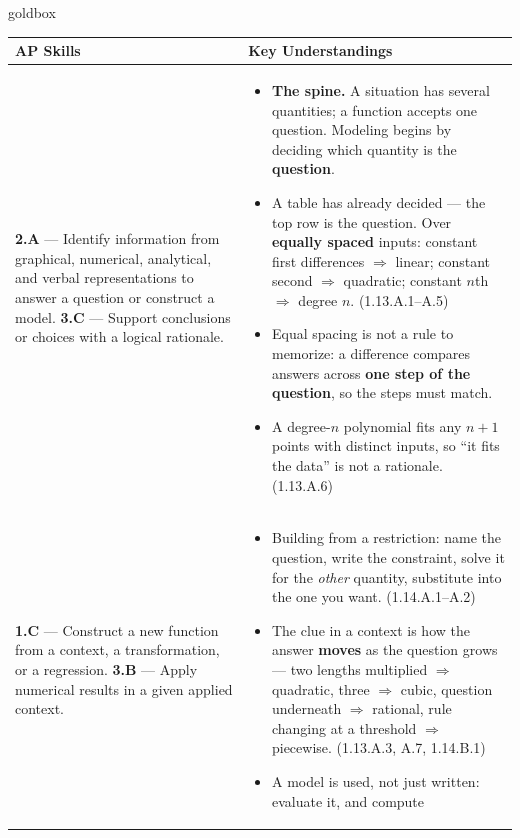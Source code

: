 \documentclass[10pt]{article}
\begin{document}
\renewcommand{\arraystretch}{1.6}
\begin{skillbox}{goldbox}
\begin{tabularx}{\linewidth}{@{}X X@{}}
\textbf{AP Skills} &
\textbf{Key Understandings} \\
\midrule
\textbf{2.A} --- Identify information from graphical, numerical, analytical, and
verbal representations to answer a question or construct a model. \newline
\textbf{3.C} --- Support conclusions or choices with a logical rationale. &
\begin{itemize}[leftmargin=1.2em,itemsep=2pt,topsep=0pt]
  \item \textbf{The spine.} A situation has several quantities; a function
        accepts one question. Modeling begins by deciding which quantity is
        the \textbf{question}.
  \item A table has already decided --- the top row is the question. Over
        \textbf{equally spaced} inputs: constant first differences $\Rightarrow$
        linear; constant second $\Rightarrow$ quadratic; constant $n$th
        $\Rightarrow$ degree $n$. (1.13.A.1--A.5)
  \item Equal spacing is not a rule to memorize: a difference compares answers
        across \textbf{one step of the question}, so the steps must match.
  \item A degree-$n$ polynomial fits any $n+1$ points with distinct inputs, so
        ``it fits the data'' is not a rationale. (1.13.A.6)
\end{itemize} \\
\textbf{1.C} --- Construct a new function from a context, a transformation, or a
regression. \newline
\textbf{3.B} --- Apply numerical results in a given applied context. &
\begin{itemize}[leftmargin=1.2em,itemsep=2pt,topsep=0pt]
  \item Building from a restriction: name the question, write the constraint,
        solve it for the \textit{other} quantity, substitute into the one you
        want. (1.14.A.1--A.2)
  \item The clue in a context is how the answer \textbf{moves} as the question
        grows --- two lengths multiplied $\Rightarrow$ quadratic, three
        $\Rightarrow$ cubic, question underneath $\Rightarrow$ rational, rule
        changing at a threshold $\Rightarrow$ piecewise. (1.13.A.3, A.7,
        1.14.B.1)
  \item A model is used, not just written: evaluate it, and compute

\end{itemize}
\end{tabularx}
\end{skillbox}
\end{document}
